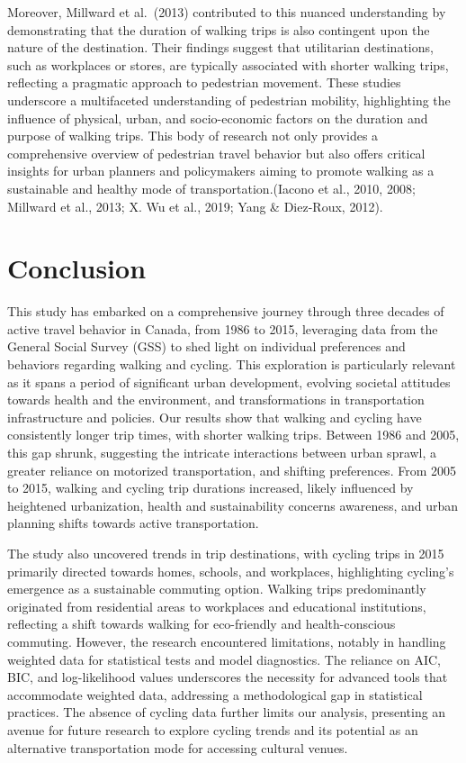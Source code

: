 \documentclass[12pt,twoside]{reedthesis}
\begin{document}
Moreover, Millward et al.~(2013) contributed to this nuanced understanding by demonstrating that the duration of walking trips is also contingent upon the nature of the destination. Their findings suggest that utilitarian destinations, such as workplaces or stores, are typically associated with shorter walking trips, reflecting a pragmatic approach to pedestrian movement.
These studies underscore a multifaceted understanding of pedestrian mobility, highlighting the influence of physical, urban, and socio-economic factors on the duration and purpose of walking trips. This body of research not only provides a comprehensive overview of pedestrian travel behavior but also offers critical insights for urban planners and policymakers aiming to promote walking as a sustainable and healthy mode of transportation.(Iacono et al., 2010, 2008; Millward et al., 2013; X. Wu et al., 2019; Yang \& Diez-Roux, 2012).

\hypertarget{conclusion}{%
\chapter*{Conclusion}\label{conclusion}}

This study has embarked on a comprehensive journey through three decades of active travel behavior in Canada, from 1986 to 2015, leveraging data from the General Social Survey (GSS) to shed light on individual preferences and behaviors regarding walking and cycling. This exploration is particularly relevant as it spans a period of significant urban development, evolving societal attitudes towards health and the environment, and transformations in transportation infrastructure and policies.
Our results show that walking and cycling have consistently longer trip times, with shorter walking trips. Between 1986 and 2005, this gap shrunk, suggesting the intricate interactions between urban sprawl, a greater reliance on motorized transportation, and shifting preferences. From 2005 to 2015, walking and cycling trip durations increased, likely influenced by heightened urbanization, health and sustainability concerns awareness, and urban planning shifts towards active transportation.

The study also uncovered trends in trip destinations, with cycling trips in 2015 primarily directed towards homes, schools, and workplaces, highlighting cycling's emergence as a sustainable commuting option. Walking trips predominantly originated from residential areas to workplaces and educational institutions, reflecting a shift towards walking for eco-friendly and health-conscious commuting.
However, the research encountered limitations, notably in handling weighted data for statistical tests and model diagnostics. The reliance on AIC, BIC, and log-likelihood values underscores the necessity for advanced tools that accommodate weighted data, addressing a methodological gap in statistical practices. The absence of cycling data further limits our analysis, presenting an avenue for future research to explore cycling trends and its potential as an alternative transportation mode for accessing cultural venues.
\end{document}
